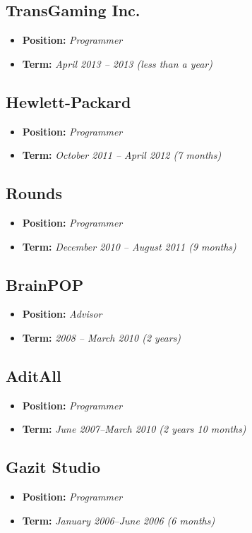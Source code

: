 \documentclass[11pt]{article}
\begin{document}
\subsection{TransGaming Inc.}
\label{sec-3-2}
\begin{itemize}
\item \textbf{Position:} \emph{Programmer}
\item \textbf{Term:} \emph{April 2013 – 2013 (less than a year)}
\end{itemize}
\subsection{Hewlett-Packard}
\label{sec-3-3}
\begin{itemize}
\item \textbf{Position:} \emph{Programmer}
\item \textbf{Term:} \emph{October 2011 – April 2012 (7 months)}
\end{itemize}
\subsection{Rounds}
\label{sec-3-4}
\begin{itemize}
\item \textbf{Position:} \emph{Programmer}
\item \textbf{Term:} \emph{December 2010 – August 2011 (9 months)}
\end{itemize}
\subsection{BrainPOP}
\label{sec-3-5}
\begin{itemize}
\item \textbf{Position:} \emph{Advisor}
\item \textbf{Term:} \emph{2008 – March 2010 (2 years)}
\end{itemize}
\subsection{AditAll}
\label{sec-3-6}
\begin{itemize}
\item \textbf{Position:} \emph{Programmer}
\item \textbf{Term:} \emph{June 2007--March 2010 (2 years 10 months)}
\end{itemize}
\subsection{Gazit Studio}
\label{sec-3-7}
\begin{itemize}
\item \textbf{Position:} \emph{Programmer}
\item \textbf{Term:} \emph{January 2006--June 2006 (6 months)}
\end{itemize}
\end{document}
